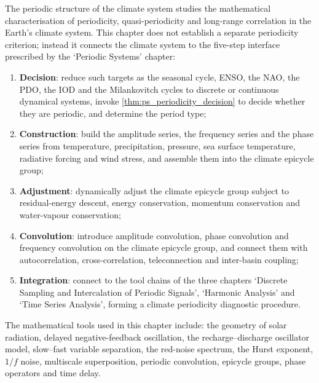 \begin{remark}\label{rem:climate_five_steps_positioning}
The periodic structure of the climate system studies the mathematical characterisation of periodicity, quasi-periodicity and long-range correlation in the Earth's climate system. This chapter does not establish a separate periodicity criterion; instead it connects the climate system to the five-step interface prescribed by the `Periodic Systems' chapter:
\begin{enumerate}[label=(\arabic*)]
    \item \textbf{Decision}: reduce such targets as the seasonal cycle, ENSO, the NAO, the PDO, the IOD and the Milankovitch cycles to discrete or continuous dynamical systems, invoke \cref{thm:ps_periodicity_decision} to decide whether they are periodic, and determine the period type;
    \item \textbf{Construction}: build the amplitude series, the frequency series and the phase series from temperature, precipitation, pressure, sea surface temperature, radiative forcing and wind stress, and assemble them into the climate epicycle group;
    \item \textbf{Adjustment}: dynamically adjust the climate epicycle group subject to residual-energy descent, energy conservation, momentum conservation and water-vapour conservation;
    \item \textbf{Convolution}: introduce amplitude convolution, phase convolution and frequency convolution on the climate epicycle group, and connect them with autocorrelation, cross-correlation, teleconnection and inter-basin coupling;
    \item \textbf{Integration}: connect to the tool chains of the three chapters `Discrete Sampling and Intercalation of Periodic Signals', `Harmonic Analysis' and `Time Series Analysis', forming a climate periodicity diagnostic procedure.
\end{enumerate}
The mathematical tools used in this chapter include: the geometry of solar radiation, delayed negative-feedback oscillation, the recharge--discharge oscillator model, slow--fast variable separation, the red-noise spectrum, the Hurst exponent, $1/f$ noise, multiscale superposition, periodic convolution, epicycle groups, phase operators and time delay.
\end{remark}

